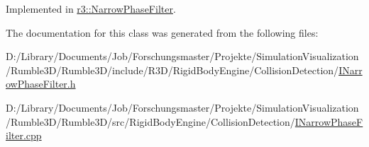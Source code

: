 Implemented in \mbox{\hyperlink{classr3_1_1_narrow_phase_filter_a7f7b7a901d5af6e616bc6df677fae086}{r3\+::\+Narrow\+Phase\+Filter}}.



The documentation for this class was generated from the following files\+:\begin{DoxyCompactItemize}
\item 
D\+:/\+Library/\+Documents/\+Job/\+Forschungsmaster/\+Projekte/\+Simulation\+Visualization/\+Rumble3\+D/\+Rumble3\+D/include/\+R3\+D/\+Rigid\+Body\+Engine/\+Collision\+Detection/\mbox{\hyperlink{_i_narrow_phase_filter_8h}{I\+Narrow\+Phase\+Filter.\+h}}\item 
D\+:/\+Library/\+Documents/\+Job/\+Forschungsmaster/\+Projekte/\+Simulation\+Visualization/\+Rumble3\+D/\+Rumble3\+D/src/\+Rigid\+Body\+Engine/\+Collision\+Detection/\mbox{\hyperlink{_i_narrow_phase_filter_8cpp}{I\+Narrow\+Phase\+Filter.\+cpp}}\end{DoxyCompactItemize}
